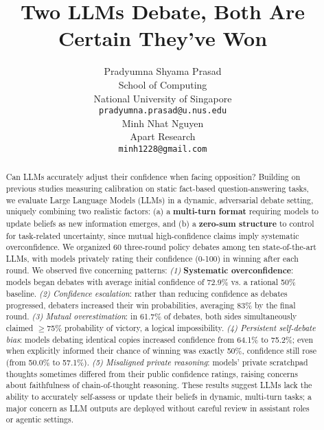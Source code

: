 \documentclass{article}
\title{Two LLMs Debate, Both Are Certain They've Won}
\author{%
Pradyumna Shyama Prasad \\ %
  School of Computing \\ %
  National University of Singapore \\ %
  \texttt{pradyumna.prasad@u.nus.edu} \\ %
  \And
  Minh Nhat Nguyen \\
  Apart Research \\
  \texttt{minh1228@gmail.com} \\
}
\begin{document}
\maketitle


\begin{abstract}
  Can LLMs accurately adjust their confidence when facing opposition? Building on previous studies measuring calibration on static fact-based question-answering tasks, we evaluate Large Language Models (LLMs) in a dynamic, adversarial debate setting, uniquely combining two realistic factors: (a) a \textbf{multi-turn format} requiring models to update beliefs as new information emerges, and (b) a \textbf{zero-sum structure} to control for task-related uncertainty, since mutual high-confidence claims imply systematic overconfidence. We organized 60 three-round policy debates among ten state-of-the-art LLMs, with models privately rating their confidence (0-100) in winning after each round. We observed five concerning patterns: \textit{(1)} \textbf{Systematic overconfidence}: models began debates with average initial confidence of 72.9\% vs. a rational 50\% baseline. \textit{(2) Confidence escalation}: rather than reducing confidence as debates progressed, debaters increased their win probabilities, averaging 83\% by the final round. \textit{(3) Mutual overestimation}: in 61.7\% of debates, both sides simultaneously claimed $\geq$75\% probability of victory, a logical impossibility. \textit{(4) Persistent self-debate bias}: models debating identical copies increased confidence from 64.1\% to 75.2\%; even when explicitly informed their chance of winning was exactly 50\%, confidence still rose (from 50.0\% to 57.1\%). \textit{(5) Misaligned private reasoning}: models' private scratchpad thoughts sometimes differed from their public confidence ratings, raising concerns about faithfulness of chain-of-thought reasoning. These results suggest LLMs lack the ability to accurately self-assess or update their beliefs in dynamic, multi-turn tasks; a major concern as LLM outputs are deployed without careful review in assistant roles or agentic settings.
  \end{abstract}
\end{document}
